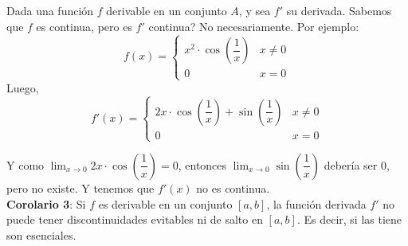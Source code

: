 \documentclass[11pt,a4paper]{article}
\begin{document}
Dada una funci\'on $f$ derivable en un conjunto $A$, y sea $f'$ su derivada. Sabemos que $f$ es continua, pero es $f'$ continua? No necesariamente. Por ejemplo:
$$f(x) = \left\{\begin{array}{ll}
x^2\cdot \cos\left(\dfrac{1}{x}\right) & x\not=0\\
0 & x=0
\end{array}\right.$$
Luego, 
$$f'(x) = \left\{\begin{array}{ll}
2x\cdot \cos\left(\dfrac{1}{x}\right) + \sin\left(\dfrac{1}{x}\right) & x\not=0\\
0 & x=0
\end{array}\right.$$

Y como $\displaystyle{\lim_{x \to 0} 2x\cdot \cos\left(\dfrac{1}{x}\right) = 0}$, entonces $\displaystyle{\lim_{x \to 0} \sin\left(\dfrac{1}{x}\right)}$ deber\'ia ser 0, pero no existe. Y tenemos que $f'(x)$ no es continua.\\

\noindent \textbf{Corolario 3}: Si $f$ es derivable en un conjunto $[a,b]$, la funci\'on derivada $f'$ no puede tener discontinuidades evitables ni de salto en $[a,b]$. Es decir, si las tiene son esenciales.
\end{document}

